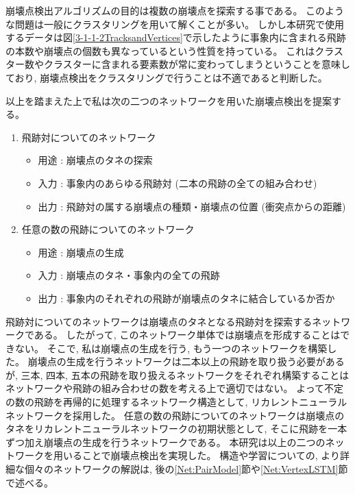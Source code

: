 崩壊点検出アルゴリズムの目的は複数の崩壊点を探索する事である。
このような問題は一般にクラスタリングを用いて解くことが多い。
しかし本研究で使用するデータは図\ref{3-1-1-2TracksandVertices}で示したように事象内に含まれる飛跡の本数や崩壊点の個数も異なっているという性質を持っている。
これはクラスター数やクラスターに含まれる要素数が常に変わってしまうということを意味しており, 崩壊点検出をクラスタリングで行うことは不適であると判断した。

以上を踏まえた上で私は次の二つのネットワークを用いた崩壊点検出を提案する。

\begin{enumerate}
 \item 飛跡対についてのネットワーク
 \begin{itemize}
  \item 用途 : 崩壊点のタネの探索
  \item 入力 : 事象内のあらゆる飛跡対 (二本の飛跡の全ての組み合わせ)
  \item 出力 : 飛跡対の属する崩壊点の種類・崩壊点の位置 (衝突点からの距離)
 \end{itemize}
 \item 任意の数の飛跡についてのネットワーク
 \begin{itemize}
  \item 用途 : 崩壊点の生成
  \item 入力 : 崩壊点のタネ・事象内の全ての飛跡
  \item 出力 : 事象内のそれぞれの飛跡が崩壊点のタネに結合しているか否か
 \end{itemize}
\end{enumerate}

飛跡対についてのネットワークは崩壊点のタネとなる飛跡対を探索するネットワークである。
したがって, このネットワーク単体では崩壊点を形成することはできない。
そこで, 私は崩壊点の生成を行う, もう一つのネットワークを構築した。
崩壊点の生成を行うネットワークは二本以上の飛跡を取り扱う必要があるが, 三本, 四本, 五本の飛跡を取り扱えるネットワークをそれぞれ構築することはネットワークや飛跡の組み合わせの数を考える上で適切ではない。
よって不定の数の飛跡を再帰的に処理するネットワーク構造として, リカレントニューラルネットワークを採用した。
任意の数の飛跡についてのネットワークは崩壊点のタネをリカレントニューラルネットワークの初期状態として, そこに飛跡を一本ずつ加え崩壊点の生成を行うネットワークである。
\newpage
本研究は以上の二つのネットワークを用いることで崩壊点検出を実現した。
構造や学習についての, より詳細な個々のネットワークの解説は, 後の\ref{Net:PairModel}節や\ref{Net:VertexLSTM}節で述べる。

